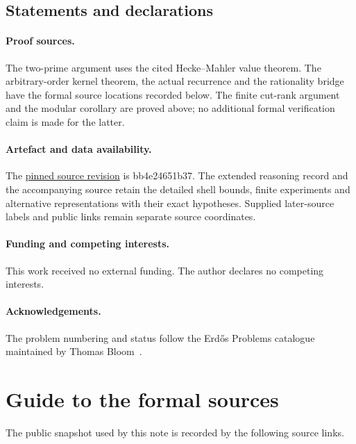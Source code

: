 \documentclass[11pt]{article}
\renewcommand{\commitshort}{bb4e24651b37}
\begin{document}
\subsection*{Statements and declarations}
\paragraph{Proof sources.}
The two-prime argument uses the cited Hecke--Mahler value theorem.
The arbitrary-order kernel theorem, the actual recurrence and the
rationality bridge have the formal source locations recorded below.
The finite cut-rank argument and the modular corollary are proved above;
no additional formal verification claim is made for the latter.

\paragraph{Artefact and data availability.}
The \href{\sourceurl}{pinned source revision} is \commitshort.
The extended reasoning record and the accompanying source retain the
detailed shell bounds, finite experiments and alternative representations
with their exact hypotheses.  Supplied later-source labels and public links remain separate
source coordinates.

\paragraph{Funding and competing interests.} This work received no external
funding.  The author declares no competing interests.
\paragraph{Acknowledgements.} The problem numbering and status follow the
Erd\H{o}s Problems catalogue maintained by Thomas Bloom~\cite{erdosproblems}.

\appendix
\section{Guide to the formal sources}\label{app:sources}

The public snapshot used by this note is recorded by the following source links.
\end{document}
